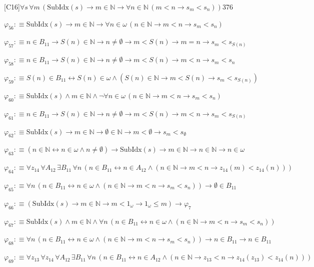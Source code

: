 \begin{fullproof}{[C16]}{$\forall s\,\forall m\,(\mathrm{SubIdx}(s) \to m \in \mathbb{N} \to \forall n \in \mathbb{N}\,(m < n \to s_{m} < s_{n}))$}{376}
\begin{abbrevlist}
\item $\varphi_{56} :\equiv \mathrm{SubIdx}(s) \to m \in \mathbb{N} \to \forall n \in \omega\,(n \in \mathbb{N} \to m < n \to s_{m} < s_{n})$
\item $\varphi_{57} :\equiv n \in B_{11} \to S(n) \in \mathbb{N} \to n \neq \emptyset \to m < S(n) \to m = n \to s_{m} < s_{S(n)}$
\item $\varphi_{58} :\equiv n \in B_{11} \to S(n) \in \mathbb{N} \to n \neq \emptyset \to m < S(n) \to m < n \to s_{m} < s_{n}$
\item $\varphi_{59} :\equiv S(n) \in B_{11} \leftrightarrow S(n) \in \omega \land (S(n) \in \mathbb{N} \to m < S(n) \to s_{m} < s_{S(n)})$
\item $\varphi_{60} :\equiv \mathrm{SubIdx}(s) \land m \in \mathbb{N} \land \neg \forall n \in \omega\,(n \in \mathbb{N} \to m < n \to s_{m} < s_{n})$
\item $\varphi_{61} :\equiv n \in B_{11} \to S(n) \in \mathbb{N} \to n \neq \emptyset \to m < S(n) \to m < n \to s_{m} < s_{S(n)}$
\item $\varphi_{62} :\equiv \mathrm{SubIdx}(s) \to m \in \mathbb{N} \to \emptyset \in \mathbb{N} \to m < \emptyset \to s_{m} < s_{\emptyset}$
\item $\varphi_{63} :\equiv (n \in \mathbb{N} \leftrightarrow n \in \omega \land n \neq \emptyset) \to \mathrm{SubIdx}(s) \to m \in \mathbb{N} \to n \in \mathbb{N} \to n \in \omega$
\item $\varphi_{64} :\equiv \forall z_{14}\,\forall A_{12}\,\exists B_{11}\,\forall n\,(n \in B_{11} \leftrightarrow n \in A_{12} \land (n \in \mathbb{N} \to m < n \to z_{14}(m) < z_{14}(n)))$
\item $\varphi_{65} :\equiv \forall n\,(n \in B_{11} \leftrightarrow n \in \omega \land (n \in \mathbb{N} \to m < n \to s_{m} < s_{n})) \to \emptyset \in B_{11}$
\item $\varphi_{66} :\equiv (\mathrm{SubIdx}(s) \to m \in \mathbb{N} \to m < 1_{\omega} \to 1_{\omega} \leq m) \to \varphi_{7}$
\item $\varphi_{67} :\equiv \mathrm{SubIdx}(s) \land m \in \mathbb{N} \land \forall n\,(n \in B_{11} \leftrightarrow n \in \omega \land (n \in \mathbb{N} \to m < n \to s_{m} < s_{n}))$
\item $\varphi_{68} :\equiv \forall n\,(n \in B_{11} \leftrightarrow n \in \omega \land (n \in \mathbb{N} \to m < n \to s_{m} < s_{n})) \to n \in B_{11} \to n \in B_{11}$
\item $\varphi_{69} :\equiv \forall z_{13}\,\forall z_{14}\,\forall A_{12}\,\exists B_{11}\,\forall n\,(n \in B_{11} \leftrightarrow n \in A_{12} \land (n \in \mathbb{N} \to z_{13} < n \to z_{14}(z_{13}) < z_{14}(n)))$

\end{abbrevlist}
\end{fullproof}
